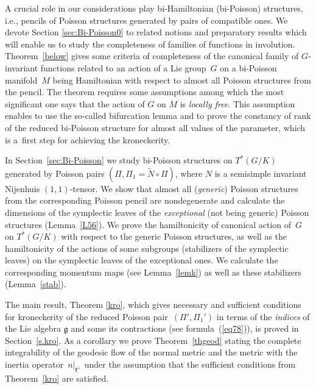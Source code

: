 \documentclass[pdftex]{sigma}
\numberwithin{equation}{section}
\begin{document}
A crucial role in our considerations play bi-Hamiltonian (bi-Poisson) structures, i.e., pencils of Poisson structures generated by pairs of compatible ones. We devote Section \ref{sec:Bi-Poisson0} to related notions and preparatory results which will enable us to study the completeness of families of functions in involution. Theorem~\ref{below} gives some criteria of completeness of the canonical family of $G$-invariant functions related to an action of a Lie group~$G$ on a bi-Poisson manifold~$M$ being Hamiltonian with respect to almost all Poisson structures from the pencil. The theorem requires some assumptions among which the most significant one says that the action of $G$ on $M$ is \emph{locally free}. This assumption enables to use the so-called bifurcation lemma and to prove the constancy of rank of the reduced bi-Poisson structure for almost all values of the parameter, which is a~first step for achieving the kroneckerity.

In Section~\ref{sec:Bi-Poisson} we study bi-Poisson structures on $T^*(G/K)$ generated by Poisson pairs $(\Pi,\Pi_1=\widetilde{N}\circ\Pi)$, where $N$ is a semisimple invariant Nijenhuis $(1,1)$-tensor. We show that almost all (\emph{generic}) Poisson structures from the corresponding Poisson pencil are nondegenerate and calculate the dimensions of the symplectic leaves of the\emph{ exceptional} (not being generic) Poisson structures (Lemma~\ref{L56}). We prove the hamiltonicity of canonical action of~$G$ on $T^*(G/K)$ with respect to the generic Poisson structures, as well as the hamiltonicity of the actions of some subgroups (stabilizers of the symplectic leaves) on the symplectic leaves of the exceptional ones. We calculate the corresponding momentum maps (see Lemma~\ref{lemk}) as well as these stabilizers (Lemma~\ref{stab}).

The main result, Theorem \ref{kro}, which gives necessary and sufficient conditions for kroneckerity of the reduced Poisson pair~$(\Pi',\Pi_1')$ in terms of the \emph{indices} of the Lie algebra $\mathfrak{g}$ and some its contractions (see formula~(\ref{eq78})), is proved in Section~\ref{s.kro}. As a corollary we prove Theorem~\ref{thgeod} stating the complete integrability of the geodesic flow of the normal metric and the metric with the inertia operator~$n|_{\mathfrak{k}^\perp}$ under the assumption that the sufficient conditions from Theorem~\ref{kro} are satisfied.
\end{document}
